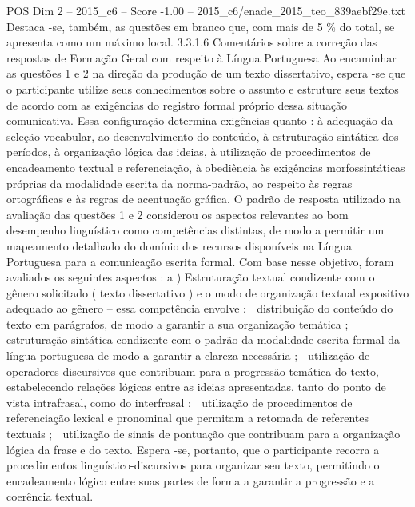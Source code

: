 \begin{textsample}{POS Dim 2 – 2015\_c6 – Score -1.00 – 2015\_c6/enade\_2015\_teo\_839aebf29e.txt}
Destaca -se, também, as questões em branco que, com mais de 5 \% do total, se apresenta como um máximo local. 3.3.1.6 Comentários sobre a correção das respostas de Formação Geral com respeito à Língua Portuguesa Ao encaminhar as questões 1 e 2 na direção da produção de um texto dissertativo, espera -se que o participante utilize seus conhecimentos sobre o assunto e estruture seus textos de acordo com as exigências do registro formal próprio dessa situação comunicativa.
Essa configuração determina exigências quanto : à adequação da seleção vocabular, ao desenvolvimento do conteúdo, à estruturação sintática dos períodos, à organização lógica das ideias, à utilização de procedimentos de encadeamento textual e referenciação, à obediência às exigências morfossintáticas próprias da modalidade escrita da norma-padrão, ao respeito às regras ortográficas e às regras de acentuação gráfica.
O padrão de resposta utilizado na avaliação das questões 1 e 2 considerou os aspectos relevantes ao bom desempenho linguístico como competências distintas, de modo a permitir um mapeamento detalhado do domínio dos recursos disponíveis na Língua Portuguesa para a comunicação escrita formal.
Com base nesse objetivo, foram avaliados os seguintes aspectos : a ) Estruturação textual condizente com o gênero solicitado ( texto dissertativo ) e o modo de organização textual expositivo adequado ao gênero – essa competência envolve :  distribuição do conteúdo do texto em parágrafos, de modo a garantir a sua organização temática ;  estruturação sintática condizente com o padrão da modalidade escrita formal da língua portuguesa de modo a garantir a clareza necessária ;  utilização de operadores discursivos que contribuam para a progressão temática do texto, estabelecendo relações lógicas entre as ideias apresentadas, tanto do ponto de vista intrafrasal, como do interfrasal ;  utilização de procedimentos de referenciação lexical e pronominal que permitam a retomada de referentes textuais ;  utilização de sinais de pontuação que contribuam para a organização lógica da frase e do texto.
Espera -se, portanto, que o participante recorra a procedimentos linguístico-discursivos para organizar seu texto, permitindo o encadeamento lógico entre suas partes de forma a garantir a progressão e a coerência textual.

\end{textsample}
